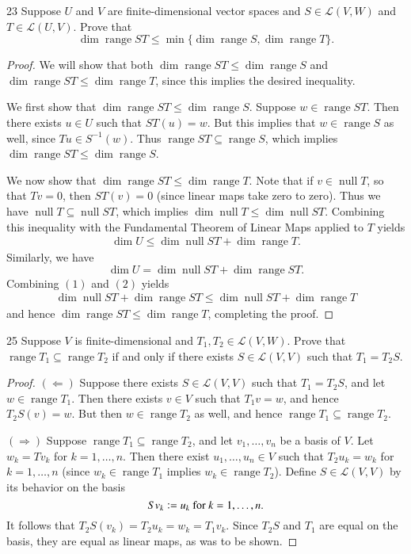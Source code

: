 \documentclass{extarticle}
\newenvironment{problem}[1]{\begin{prob*}{#1}{}}{\end{prob*}}
\newcommand{\Hom}{\mathcal{L}}
\DeclareMathOperator{\Null}{null}
\DeclareMathOperator{\Range}{range}
\newcommand{\defeq}{\vcentcolon=}
\begin{document}
\begin{problem}{23}
Suppose $U$ and $V$ are finite-dimensional vector spaces and $S\in\Hom(V,W)$ and $T\in\Hom(U,V)$.  Prove that
\begin{equation*}
\dim\Range ST \leq \min\{\dim\Range S, \dim\Range T\}.
\end{equation*}
\end{problem}
\begin{proof}
We will show that both $\dim\Range ST \leq \dim \Range S$ and $\dim\Range ST \leq \dim \Range T$, since this implies the desired inequality.
\par We first show that $\dim\Range ST \leq \dim \Range S$.  Suppose $w \in \Range ST$.  Then there exists $u\in U$ such that $ST(u) = w$.  But this implies that $w\in\Range S$ as well, since $Tu\in S^{-1}(w)$.  Thus $\Range ST \subseteq \Range S$, which implies $\dim \Range ST \leq \dim\Range S$.
\par We now show that $\dim\Range ST \leq \dim \Range T$.  Note that if $v\in\Null T$, so that $Tv =0$, then $ST(v) = 0$ (since linear maps take zero to zero).  Thus we have $\Null T\subseteq \Null ST$, which implies $\dim \Null T\leq \dim \Null ST$.  Combining this inequality with the Fundamental Theorem of Linear Maps applied to $T$ yields
\begin{align}
\dim U \leq \dim \Null ST + \dim \Range T.
\end{align}
Similarly, we have
\begin{equation}
\dim U = \dim\Null ST + \dim\Range ST.
\end{equation}
Combining $(1)$ and $(2)$ yields
\begin{align*}
\dim\Null ST + \dim\Range ST \leq \dim\Null ST + \dim\Range T
\end{align*}
and hence $\dim\Range ST \leq \dim\Range T$, completing the proof.
\end{proof}

\begin{problem}{25}
Suppose $V$ is finite-dimensional and $T_1,T_2\in\Hom(V,W)$.  Prove that $\Range T_1\subseteq \Range T_2$ if and only if there exists $S\in\Hom(V,V)$ such that $T_1= T_2S$.  
\end{problem}
\begin{proof}
$(\Leftarrow)$ Suppose there exists $S\in\Hom(V,V)$ such that $T_1=T_2S$, and let $w\in\Range T_1$.  Then there exists $v\in V$ such that $T_1v = w$, and hence $T_2S(v) = w$.  But then $w \in\Range T_2$ as well, and hence $\Range T_1\subseteq \Range T_2$.
\par $(\Rightarrow)$  Suppose $\Range T_1\subseteq \Range T_2$, and let $v_1,\dots, v_n$ be a basis of $V$.  Let $w_k = Tv_k$ for $k=1,\dots, n$.  Then there exist $u_1,\dots,u_n\in V$ such that $T_2u_k = w_k$ for $k=1,\dots,n$ (since $w_k\in\Range T_1$ implies $w_k\in\Range T_2$).  Define $S\in\Hom(V,V)$ by its behavior on the basis
\begin{equation*}
Sv_k \defeq u_k \text{ for }k= 1,\dots, n.
\end{equation*}
It follows that $T_2S(v_k) = T_2u_k = w_k = T_1v_k$.  Since $T_2S$ and $T_1$ are equal on the basis, they are equal as linear maps, as was to be shown.
\end{proof}
\end{document}
